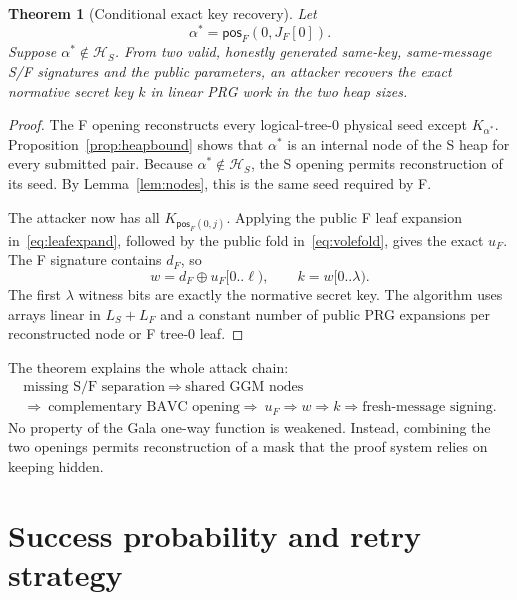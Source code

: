 \documentclass[11pt,a4paper]{article}
\newtheorem{theorem}{Theorem}
\newcommand{\xor}{\mathbin{\oplus}}
\newcommand{\pos}{\mathsf{pos}}
\begin{document}
\begin{theorem}[Conditional exact key recovery]\label{thm:recovery}
Let
\[
             \alpha^*=\pos_F(0,J_F[0]).
\]
Suppose $\alpha^*\notin\mathcal H_S$.  From two valid, honestly generated
same-key, same-message S/F signatures and the public parameters, an attacker
recovers the exact normative secret key $k$ in linear PRG work in the two heap
sizes.
\end{theorem}
\begin{proof}
The F opening reconstructs every logical-tree-0 physical seed except
$K_{\alpha^*}$.  Proposition~\ref{prop:heapbound} shows that $\alpha^*$ is an
internal node of the S heap for every submitted pair.  Because
$\alpha^*\notin\mathcal H_S$, the S opening permits reconstruction of its seed.
By
Lemma~\ref{lem:nodes}, this is the same seed required by F.

The attacker now has all $K_{\pos_F(0,j)}$.  Applying the public F leaf expansion
in~\eqref{eq:leafexpand}, followed by the public fold in~\eqref{eq:volefold},
gives the exact $u_F$.  The F signature contains $d_F$, so
\begin{equation}
       w=d_F\xor u_F[0..\ell),\qquad k=w[0..\lambda).   \label{eq:recover}
\end{equation}
The first $\lambda$ witness bits are exactly the normative secret key.  The
algorithm uses arrays linear in $L_S+L_F$ and a constant number of public PRG
expansions per reconstructed node or F tree-0 leaf.
\end{proof}

The theorem explains the whole attack chain:
\[
\boxed{\begin{array}{c}
\text{missing S/F separation}\ \Longrightarrow\ \text{shared GGM nodes}\\
\Longrightarrow\ \text{complementary BAVC opening}
\Longrightarrow\ u_F\Longrightarrow w\Longrightarrow k
\Longrightarrow\text{fresh-message signing.}
\end{array}}
\]
No property of the Gala one-way function is weakened.  Instead, combining the
two openings permits reconstruction of a mask that the proof system relies on
keeping hidden.

\section{Success probability and retry strategy}
\end{document}

